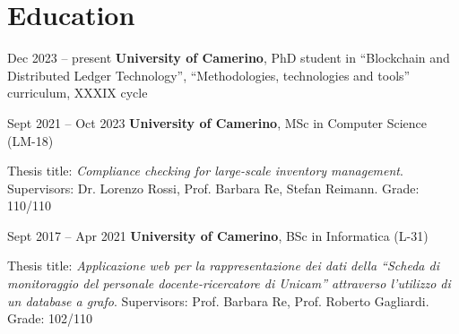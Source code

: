 \section{Education}

    \begin{twocolentry}{Dec 2023 – present}
        \textbf{University of Camerino}, PhD student in ``Blockchain and Distributed Ledger Technology'', ``Methodologies, technologies and tools'' curriculum, XXXIX cycle
    \end{twocolentry}
    
    \abitspace

    \begin{twocolentry}{Sept 2021 – Oct 2023}
        \textbf{University of Camerino}, MSc in Computer Science (LM-18)
    \end{twocolentry}
    Thesis title: \textit{Compliance checking for large-scale inventory management}. Supervisors: Dr. Lorenzo Rossi, Prof. Barbara Re, Stefan Reimann. Grade: 110/110
    
    \abitspace
    
    \begin{twocolentry}{Sept 2017 – Apr 2021}
        \textbf{University of Camerino}, BSc in Informatica (L-31)
    \end{twocolentry}
    Thesis title: \textit{Applicazione web per la rappresentazione dei dati della ``Scheda di monitoraggio del personale docente-ricercatore di Unicam'' attraverso l’utilizzo di un database a grafo}. Supervisors: Prof. Barbara Re, Prof. Roberto Gagliardi. Grade: 102/110